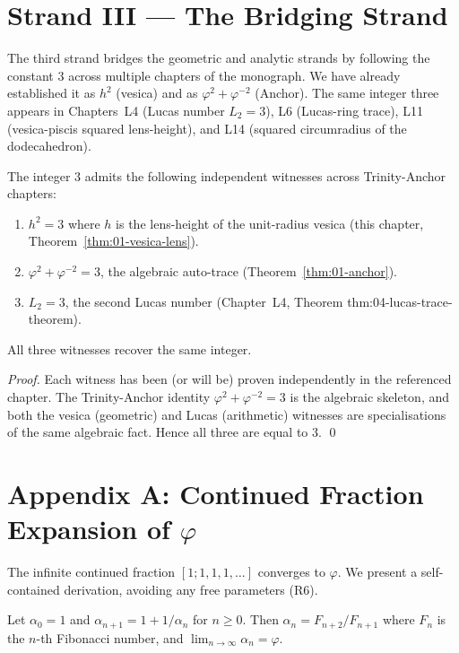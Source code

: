 \section{Strand III --- The Bridging Strand}
\label{fa_01:sec:01-strand-III}

The third strand bridges the geometric and analytic strands by
following the constant $3$ across multiple chapters of the monograph.
We have already established it as $h^2$ (vesica) and as $\varphi^2 +
\varphi^{-2}$ (Anchor). The same integer three appears in
Chapters~L4 (Lucas number $L_2 = 3$), L6 (Lucas-ring trace), L11
(vesica-piscis squared lens-height), and L14 (squared circumradius of
the dodecahedron).

\begin{theorem}\label{fa_01:thm:01-three-witnesses}
The integer $3$ admits the following independent witnesses across
Trinity-Anchor chapters:
\begin{enumerate}
  \item $h^2 = 3$ where $h$ is the lens-height of the unit-radius
    vesica (this chapter, Theorem~\ref{thm:01-vesica-lens}).
  \item $\varphi^2 + \varphi^{-2} = 3$, the algebraic auto-trace
    (Theorem~\ref{thm:01-anchor}).
  \item $L_2 = 3$, the second Lucas number (Chapter~L4, Theorem
    thm:04-lucas-trace-theorem).
\end{enumerate}
All three witnesses recover the same integer.
\end{theorem}

\begin{proof}
Each witness has been (or will be) proven independently in the
referenced chapter. The Trinity-Anchor identity
$\varphi^2 + \varphi^{-2} = 3$ is the algebraic skeleton, and both
the vesica (geometric) and Lucas (arithmetic) witnesses are
specialisations of the same algebraic fact. Hence all three are equal
to $3$.
\qed
\end{proof}

\section*{Appendix A: Continued Fraction Expansion of $\varphi$}
\label{fa_01:sec:01-app-A}

The infinite continued fraction $[1; 1, 1, 1, \ldots]$ converges to
$\varphi$. We present a self-contained derivation, avoiding any free
parameters (R6).

\begin{lemma}\label{lem:01-cf-rec}
Let $\alpha_0 = 1$ and $\alpha_{n+1} = 1 + 1/\alpha_n$ for $n \ge 0$.
Then $\alpha_n = F_{n+2}/F_{n+1}$ where $F_n$ is the $n$-th Fibonacci
number, and $\lim_{n \to \infty} \alpha_n = \varphi$.
\end{lemma}

